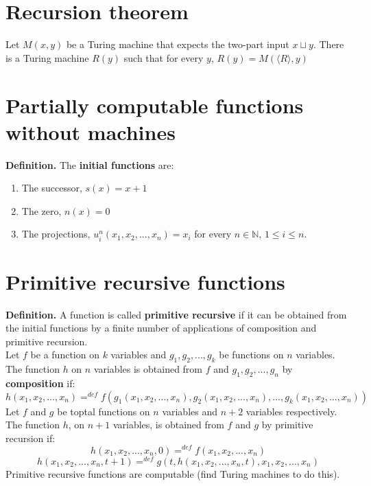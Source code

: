 \documentclass{article}
\begin{document}
\section{Recursion theorem}
Let $M(x, y)$ be a Turing machine that expects the two-part input $x\sqcup y$. There is a Turing machine $R(y)$ such that for every $y$, $R(y) = M(\langle R\rangle, y)$

\section{Partially computable functions without machines}
\textbf{Definition.} The \textbf{initial functions} are:
\begin{enumerate}
	\item The successor, $s(x) = x + 1$
	\item The zero, $n(x) = 0$
	\item The projections, $u_i^n(x_1, x_2, ..., x_n) = x_i$ for every $n \in \mathbb{N}$, $1 \leq i \leq n$.
\end{enumerate}

\section{Primitive recursive functions}
\textbf{Definition.} A function is called \textbf{primitive recursive} if it can be obtained from the initial functions by a finite number of applications of composition and primitive recursion.\medskip
\\ Let $f$ be a function on $k$ variables and $g_1, g_2, ..., g_k$ be functions on $n$ variables. The function $h$ on $n$ variables is obtained from $f$ and $g_1, g_2, ..., g_n$ by \textbf{composition} if:
$$h(x_1, x_2, ..., x_n) =^{def} f(g_1(x_1, x_2, ..., x_n), g_2(x_1, x_2, ..., x_n), ..., g_k(x_1, x_2, ..., x_n))$$
Let $f$ and $g$ be toptal functions on $n$ variables and $n+2$ variables respectively. The function $h$, on $n+1$ variables, is obtained from $f$ and $g$ by primitive recursion if:
$$h(x_1, x_2, ..., x_n, 0) =^{def} f(x_1, x_2, ..., x_n)$$
$$h(x_1, x_2, ..., x_n, t+1) = ^{def} g(t, h(x_1, x_2, ..., x_n, t), x_1, x_2, ..., x_n)$$
Primitive recursive functions are computable (find Turing machines to do this).
\end{document}
